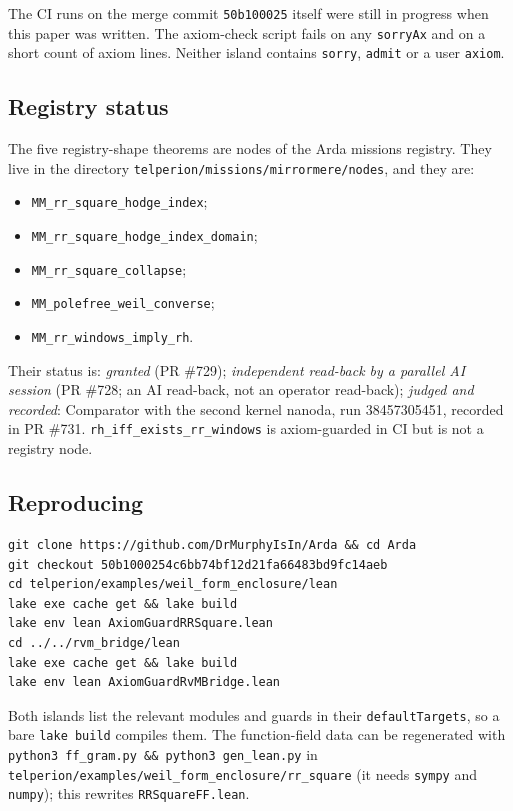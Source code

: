\documentclass[11pt]{article}
\theoremstyle{definition}
\newcommand{\lean}[1]{\texttt{#1}}
\begin{document}
\noindent The CI runs on the merge commit \lean{50b100025} itself were still in progress when this paper was written. The axiom-check script fails on any \lean{sorryAx} and on a short count of axiom lines. Neither island contains \lean{sorry}, \lean{admit} or a user \lean{axiom}.

\subsection{Registry status}

The five registry-shape theorems are nodes of the Arda missions registry. They live in the directory \lean{telperion/missions/mirrormere/nodes}, and they are:
\begin{itemize}[leftmargin=*]
\item \lean{MM\_rr\_square\_hodge\_index};
\item \lean{MM\_rr\_square\_hodge\_index\_domain};
\item \lean{MM\_rr\_square\_collapse};
\item \lean{MM\_polefree\_weil\_converse};
\item \lean{MM\_rr\_windows\_imply\_rh}.
\end{itemize}
Their status is: \emph{granted} (PR \#729); \emph{independent read-back by a parallel AI session} (PR \#728; an AI read-back, not an operator read-back); \emph{judged and recorded}: Comparator with the second kernel nanoda, run 38457305451, recorded in PR \#731. \lean{rh\_iff\_exists\_rr\_windows} is axiom-guarded in CI but is not a registry node.

\subsection{Reproducing}

\begin{lstlisting}
git clone https://github.com/DrMurphyIsIn/Arda && cd Arda
git checkout 50b1000254c6bb74bf12d21fa66483bd9fc14aeb
cd telperion/examples/weil_form_enclosure/lean
lake exe cache get && lake build
lake env lean AxiomGuardRRSquare.lean
cd ../../rvm_bridge/lean
lake exe cache get && lake build
lake env lean AxiomGuardRvMBridge.lean
\end{lstlisting}
\noindent Both islands list the relevant modules and guards in their \lean{defaultTargets}, so a bare \lean{lake build} compiles them. The function-field data can be regenerated with \lean{python3 ff\_gram.py \&\& python3 gen\_lean.py} in \lean{telperion/examples/weil\_form\_enclosure/rr\_square} (it needs \lean{sympy} and \lean{numpy}); this rewrites \lean{RRSquareFF.lean}.
\end{document}
